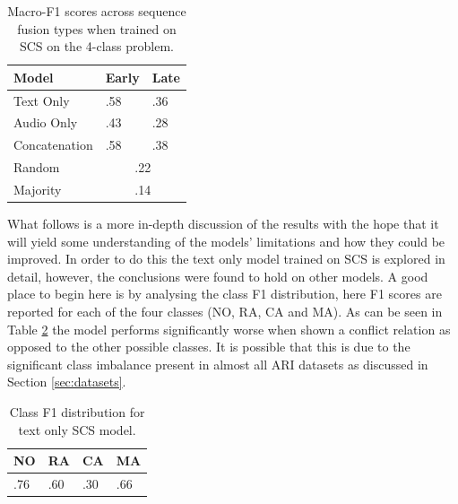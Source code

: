 \documentclass[twocolumn]{article}
\begin{document}
\begin{table}[h]
\centering
\caption{Macro-F1 scores across sequence fusion types when trained on SCS on the 4-class problem. \label{tbl:results-seq-4class}}
\begin{tabular}{|l|ll|}
\hline
Model         & Early       & Late      \\ \hline
Text Only     & .58         & .36       \\
Audio Only    & .43         & .28       \\
Concatenation & .58         & .38       \\ \hline
Random        & \multicolumn{2}{c|}{.22} \\
Majority      & \multicolumn{2}{c|}{.14} \\ \hline
\end{tabular}
\end{table}

What follows is a more in-depth discussion of the results with the hope
that it will yield some understanding of the models' limitations and how
they could be improved. In order to do this the text only model trained
on SCS is explored in detail, however, the conclusions were found to
hold on other models. A good place to begin here is by analysing the
class F1 distribution, here F1 scores are reported for each of the four
classes (NO, RA, CA and MA). As can be seen in Table
\ref{tbl:class-f1-4class} the model performs significantly worse when
shown a conflict relation as opposed to the other possible classes. It
is possible that this is due to the significant class imbalance present
in almost all ARI datasets as discussed in Section \ref{sec:datasets}.

\begin{table}[h]
\centering
\caption{Class F1 distribution for text only SCS model.\label{tbl:class-f1-4class}}
\begin{tabular}{|llll|}
\hline
NO & RA & CA & MA              \\ \hline
.76         & .60         & .30         & .66 \\ \hline
\end{tabular}
\end{table}
\end{document}
